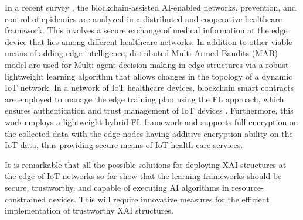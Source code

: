 \documentclass[journal]{IEEEtran}
\begin{document}
In a recent survey \cite{otoum2021preventing}, the blockchain-assisted AI-enabled networks, prevention, and control of epidemics are analyzed in a distributed and cooperative healthcare framework. This involves a secure exchange of medical information at the edge device that lies among different healthcare networks. In addition to other viable means of adding edge intelligence, distributed Multi-Armed Bandits (MAB) model \cite{chen2021distributed} are used for Multi-agent decision-making in edge structures via a robust lightweight learning algorithm that allows changes in the topology of a dynamic IoT network. In a network of IoT healthcare devices, blockchain smart contracts are employed to manage the edge training plan using the FL approach, which ensures authentication and trust management of IoT devices \cite{rahman2020secure}. Furthermore, this work employs a lightweight hybrid FL framework and supports full encryption on the collected data with the edge nodes having additive encryption ability on the IoT data, thus providing secure means of IoT health care services. 

It is remarkable that all the possible solutions for deploying XAI structures at the edge of IoT networks so far show that the learning frameworks should be secure, trustworthy, and capable of executing AI algorithms in resource-constrained devices. This will require innovative measures for the efficient implementation of trustworthy XAI structures. 
\end{document}

